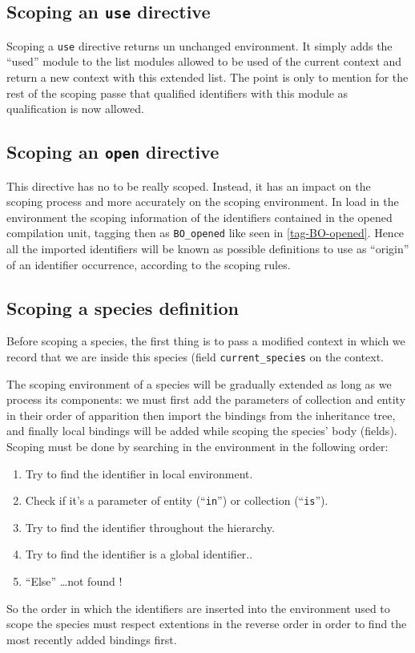 \subsection{Scoping an {\tt use} directive}
Scoping a {\tt use} directive returns un unchanged environment.
It simply adds the ``used'' module to the list modules allowed to be
used of the current context and return a new context with this
extended list. The point is only to mention for the rest of the
scoping passe that qualified identifiers with this module as
qualification is now allowed.


\subsection{Scoping an {\tt open} directive}
This directive has no to be really scoped. Instead, it has an impact
on the scoping process and more accurately on the scoping environment.
In load in the environment the scoping information of the identifiers
contained in the opened compilation unit, tagging then as
{\tt BO\_opened} like seen in \ref{tag-BO-opened}. Hence all the
imported identifiers will be known as possible definitions to use as
``origin'' of an identifier occurrence, according to the scoping
rules.


\subsection{Scoping a species definition}
Before scoping a species, the first thing is to pass a modified
context in which we record that we are inside this species (field
{\tt current\_species} on the context.

The scoping environment of a species will be gradually extended as
long as we process its components: we must first add the parameters of
collection and entity in their order of apparition then import the
bindings from the inheritance tree, and finally local bindings will be
added while scoping the species' body (fields). Scoping must be done
by searching in the environment in the following order:
\begin{enumerate}
\item Try to find the identifier in local environment.
\item Check if it's a parameter of entity (``{\tt in}'') or collection
  (``{\tt is}'').
\item Try to find the identifier throughout the hierarchy.
\item Try to find the identifier is a global identifier..
\item ``Else'' \ldots not found !
\end{enumerate}
So the order in which the identifiers are inserted into the
environment used to scope the species must respect extentions in the
reverse order in order to find the most recently added bindings first.

